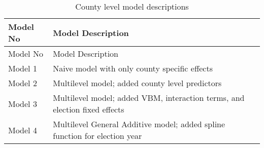 \documentclass[]{article}
\begin{document}
\begin{longtable}[]{@{}ll@{}}
\caption{County level model descriptions
\label{tab:model_desc_county}}\tabularnewline
\toprule
\begin{minipage}[b]{0.15\columnwidth}\raggedright\strut
Model No\strut
\end{minipage} & \begin{minipage}[b]{0.80\columnwidth}\raggedright\strut
Model Description\strut
\end{minipage}\tabularnewline
\midrule
\endfirsthead
\toprule
\begin{minipage}[b]{0.15\columnwidth}\raggedright\strut
Model No\strut
\end{minipage} & \begin{minipage}[b]{0.80\columnwidth}\raggedright\strut
Model Description\strut
\end{minipage}\tabularnewline
\midrule
\endhead
\begin{minipage}[t]{0.15\columnwidth}\raggedright\strut
Model 1\strut
\end{minipage} & \begin{minipage}[t]{0.80\columnwidth}\raggedright\strut
Naive model with only county specific effects\strut
\end{minipage}\tabularnewline
\begin{minipage}[t]{0.15\columnwidth}\raggedright\strut
Model 2\strut
\end{minipage} & \begin{minipage}[t]{0.80\columnwidth}\raggedright\strut
Multilevel model; added county level predictors\strut
\end{minipage}\tabularnewline
\begin{minipage}[t]{0.15\columnwidth}\raggedright\strut
Model 3\strut
\end{minipage} & \begin{minipage}[t]{0.80\columnwidth}\raggedright\strut
Multilevel model; added VBM, interaction terms, and election fixed
effects\strut
\end{minipage}\tabularnewline
\begin{minipage}[t]{0.15\columnwidth}\raggedright\strut
Model 4\strut
\end{minipage} & \begin{minipage}[t]{0.80\columnwidth}\raggedright\strut
Multilevel General Additive model; added spline function for election
year\strut
\end{minipage}\tabularnewline
\bottomrule
\end{longtable}
\end{document}
